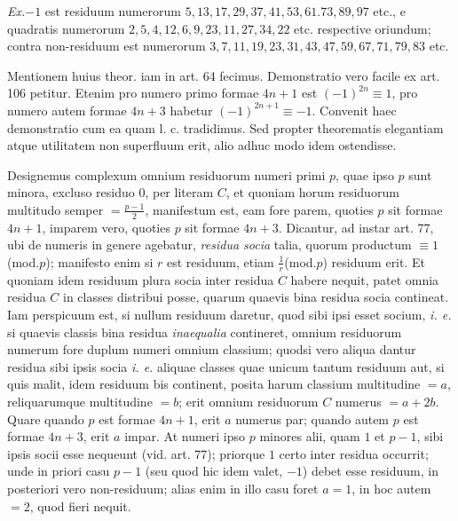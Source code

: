 \emph{Ex.}\quad $-1$ est residuum numerorum $5,\allowbreak 13,\allowbreak 17,\allowbreak 29,\allowbreak 37,\allowbreak 41,\allowbreak 53,\allowbreak 61.73,\allowbreak 89,\allowbreak 97$ etc., e quadratis numerorum $2,\allowbreak 5,\allowbreak 4,\allowbreak 12,\allowbreak 6,\allowbreak 9,\allowbreak 23,\allowbreak 11,\allowbreak 27,\allowbreak 34,\allowbreak 22$ etc. respective oriundum; contra non-residuum est numerorum $3,\allowbreak 7,\allowbreak 11,\allowbreak 19,\allowbreak 23,\allowbreak 31,\allowbreak 43,\allowbreak 47,\allowbreak 59,\allowbreak 67,\allowbreak 71,\allowbreak 79,\allowbreak 83$ etc.

Mentionem huius theor. iam in art. 64 fecimus. Demonstratio vero facile ex art. 106 petitur. Etenim pro numero primo formae $4n+1$ est $(-1)^{2n}\equiv1$, pro numero autem formae $4n+3$ habetur $(-1)^{2n+1}\equiv-1$. Convenit haec demonstratio cum ea quam l. c. tradidimus. Sed propter theorematis elegantiam atque utilitatem non superfluum erit, alio adhuc modo idem ostendisse.

Designemus complexum omnium residuorum numeri primi $p$, quae ipso $p$ sunt minora, excluso residuo $0$, per literam $C$, et quoniam horum residuorum multitudo semper $=\frac{p-1}{2}$, manifestum est, eam fore parem, quoties $p$ sit formae $4n+1$, imparem vero, quoties $p$ sit formae $4n+3$. Dicantur, ad instar art. 77, ubi de numeris in genere agebatur, \emph{residua socia} talia, quorum productum $\equiv1$ (mod.$p$); manifesto enim si $r$ est residuum, etiam $\frac{1}{r}$(mod.$p$) residuum erit. Et quoniam idem residuum plura socia inter residua $C$ habere nequit, patet omnia residua $C$ in classes distribui posse, quarum quaevis bina residua socia contineat. Iam perspicuum est, si nullum residuum daretur, quod sibi ipsi esset socium, \emph{i. e.} si quaevis classis bina residua \emph{inaequalia} contineret, omnium residuorum numerum fore duplum numeri omnium classium; quodsi vero aliqua dantur residua sibi ipsis socia \emph{i. e.} aliquae classes quae unicum tantum residuum aut, si quis malit, idem residuum bis continent, posita harum classium multitudine $=a$, reliquarumque multitudine $=b$; erit omnium residuorum $C$ numerus $=a+2b$. Quare quando $p$ est formae $4n+1$, erit $a$ numerus par; quando autem $p$ est formae $4n+3$, erit $a$ impar. At numeri ipso $p$ minores alii, quam $1$ et $p-1$, sibi ipsis socii esse nequeunt (vid. art. 77); priorque $1$ certo inter residua occurrit; unde in priori casu $p-1$ (seu quod hic idem valet, $-1$) debet esse residuum, in posteriori vero non-residuum; alias enim in illo casu foret $a=1$, in hoc autem $=2$, quod fieri nequit.

